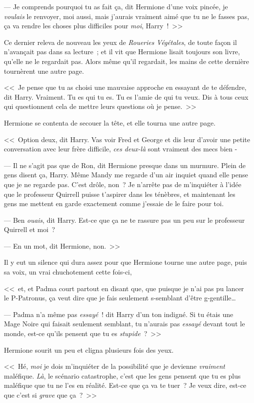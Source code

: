--- Je comprends pourquoi tu as fait ça, dit Hermione d'une voix pincée, je \emph{voulais} le renvoyer, moi aussi, mais j'aurais vraiment aimé que tu ne le fasses pas, ça va rendre les choses plus difficiles pour \emph{moi}, Harry~!~>>

Ce dernier releva de nouveau les yeux de \emph{Roueries Végétales}, de toute façon il n'avançait pas dans sa lecture~; et il vit que Hermione lisait toujours son livre, qu'elle ne le regardait pas. Alors même qu'il regardait, les mains de cette dernière tournèrent une autre page.

<<~Je pense que tu as choisi une mauvaise approche en essayant de te défendre, dit Harry. Vraiment. Tu es qui tu es. Tu es l'amie de qui tu veux. Dis à tous ceux qui questionnent cela de mettre leurs questions où je pense.~>>

Hermione se contenta de secouer la tête, et elle tourna une autre page.

<<~Option deux, dit Harry. Vas voir Fred et George et dis leur d'avoir une petite conversation avec leur frère difficile, \emph{ces deux-là} sont vraiment des mecs bien -

--- Il ne s'agit pas que de Ron, dit Hermione presque dans un murmure. Plein de gens disent ça, Harry. Même Mandy me regarde d'un air inquiet quand elle pense que je ne regarde pas. C'est drôle, non~? Je n'arrête pas de m'inquiéter à l'idée que le professeur Quirrell puisse t'aspirer dans les ténèbres, et maintenant les gens me mettent en garde exactement comme j'essaie de le faire pour toi.

--- Ben \emph{ouais}, dit Harry. Est-ce que ça ne te rassure pas un peu sur le professeur Quirrell et moi~?

--- En un mot, dit Hermione, non.~>>

Il y eut un silence qui dura assez pour que Hermione tourne une autre page, puis sa voix, un vrai chuchotement cette fois-ci,

<<~et, et Padma court partout en disant que, que puisque je n'ai pas pu lancer le P-Patronus, ça veut dire que je fais seulement s-semblant d'être g-gentille…

--- Padma n'a même pas \emph{essayé}~! dit Harry d'un ton indigné. Si tu étais une Mage Noire qui faisait seulement semblant, tu n'aurais pas \emph{essayé} devant tout le monde, est-ce qu'ils pensent que tu es \emph{stupide}~?~>>

Hermione sourit un peu et cligna plusieurs fois des yeux.

<<~Hé, \emph{moi} je dois m'inquiéter de la possibilité que je devienne \emph{vraiment} maléfique. \emph{Là}, le scénario catastrophe, c'est que les gens pensent que tu es plus maléfique que tu ne l'es en réalité. Est-ce que ça va te tuer~? Je veux dire, est-ce que c'est si \emph{grave} que ça~?~>>

